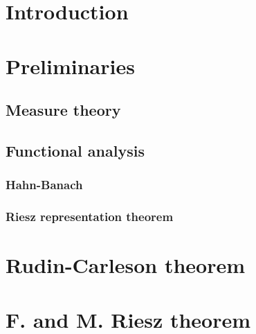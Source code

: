 \documentclass[a4paper,12pt,twoside,BCOR=10mm]{scrbook}
\begin{document}
\chapter{Introduction}

\chapter{Preliminaries}
\section{Measure theory}
\section{Functional analysis}
\subsection{Hahn-Banach}
\subsection{Riesz representation theorem}
\chapter{Rudin-Carleson theorem}
\chapter{F. and M. Riesz theorem}
\end{document}
